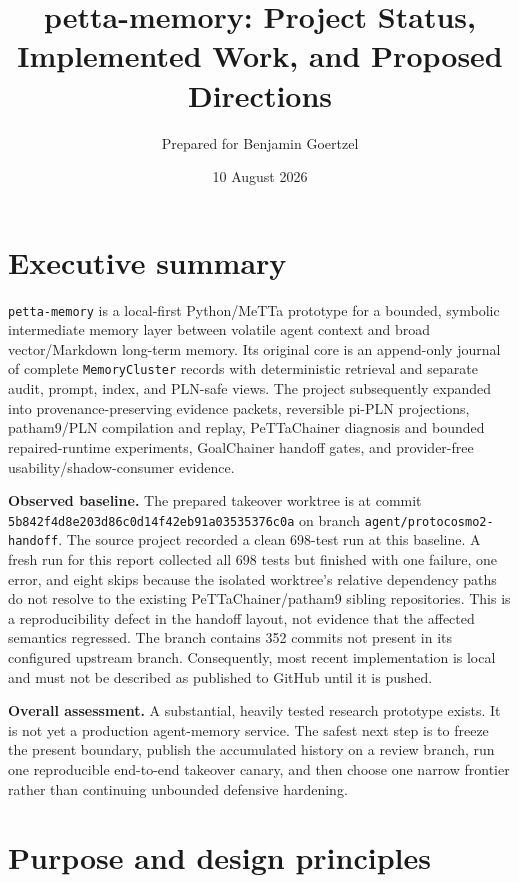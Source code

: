 \documentclass[11pt]{article}
\title{petta-memory: Project Status, Implemented Work, and Proposed Directions}
\author{Prepared for Benjamin Goertzel}
\date{10 August 2026}
\begin{document}
\maketitle

\section*{Executive summary}

\texttt{petta-memory} is a local-first Python/MeTTa prototype for a bounded,
symbolic intermediate memory layer between volatile agent context and broad
vector/Markdown long-term memory.  Its original core is an append-only journal
of complete \texttt{MemoryCluster} records with deterministic retrieval and
separate audit, prompt, index, and PLN-safe views.  The project subsequently
expanded into provenance-preserving evidence packets, reversible pi-PLN
projections, patham9/PLN compilation and replay, PeTTaChainer diagnosis and
bounded repaired-runtime experiments, GoalChainer handoff gates, and
provider-free usability/shadow-consumer evidence.

\textbf{Observed baseline.}  The prepared takeover worktree is at commit
\texttt{5b842f4d8e203d86c0d14f42eb91a03535376c0a} on branch
\texttt{agent/protocosmo2-handoff}.  The source project recorded a clean
698-test run at this baseline.  A fresh run for this report collected all 698
tests but finished with one failure, one error, and eight skips because the
isolated worktree's relative dependency paths do not resolve to the existing
PeTTaChainer/patham9 sibling repositories.  This is a reproducibility defect in
the handoff layout, not evidence that the affected semantics regressed.  The
branch contains 352 commits not present in
its configured upstream branch.  Consequently, most recent implementation is
local and must not be described as published to GitHub until it is pushed.

\textbf{Overall assessment.}  A substantial, heavily tested research prototype
exists.  It is not yet a production agent-memory service.  The safest next
step is to freeze the present boundary, publish the accumulated history on a
review branch, run one reproducible end-to-end takeover canary, and then choose
one narrow frontier rather than continuing unbounded defensive hardening.

\section{Purpose and design principles}
\end{document}
